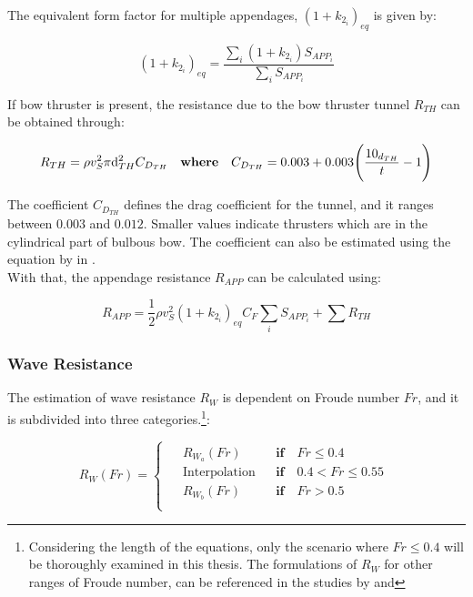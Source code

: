 The equivalent form factor for multiple appendages, $(1+k_{2_i})_{eq}$ is given by:

\begin{equation}\label{eqn:k2eq}
    (1+k_{2_i})_{eq} = \frac{\sum_i(1+k_{2_i})S_{APP_i}}{\sum_iS_{APP_i}}
\end{equation}

If bow thruster is present, the resistance due to the bow thruster tunnel $R_{TH}$ can be obtained through:

\begin{equation}\label{eqn:R_th}
    R_{TH} = \rho v_S^2 \pi \d_{TH}^2 C_{D_{TH}} \quad \textbf{where} \quad C_{D_{TH}} = 0.003 + 0.003 \Biggl( \frac{10_{d_{TH}}}{t} - 1 \Biggr) 
\end{equation}

The coefficient $C_{D_{TH}}$ defines the drag coefficient for the tunnel, and it ranges between $0.003$ and $0.012$. Smaller values indicate thrusters which are in the cylindrical part of bulbous bow. The coefficient can also be estimated using the equation by  in .\\

With that, the appendage resistance $R_{APP}$ can be calculated using:

\begin{equation}\label{R_app}
    R_{APP} = \frac{1}{2}\rho v_S^2 (1+k_{2_i})_{eq} C_F \sum_i S_{APP_i} + \sum R_{TH}
\end{equation}

\subsubsection*{Wave Resistance}

The estimation of wave resistance $R_W$ is dependent on Froude number $Fr$, and it is subdivided into three categories.\footnote{Considering the length of the equations, only the scenario where $Fr \leqslant 0.4$ will be thoroughly examined in this thesis. The formulations of $R_W$ for other ranges of Froude number, can be referenced in the studies by  and }:

\begin{equation}
    \label{eqn:case_Rw}
    R_W(Fr) = 
    \begin{cases}
        \begin{aligned}
        &R_{W_a}(Fr) && \textbf{if} \quad Fr \leqslant 0.4 \\
        &\text{Interpolation} && \textbf{if} \quad 0.4 < Fr \leqslant 0.55 \\
        &R_{W_b}(Fr) && \textbf{if} \quad Fr > 0.5 \\
    \end{aligned}
    \end{cases}
\end{equation}

